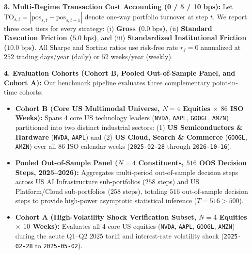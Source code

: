 \documentclass[10pt,a4paper,twocolumn]{article}
\begin{document}
\noindent\textbf{3. Multi-Regime Transaction Cost Accounting (0 / 5 / 10 bps):} Let $\text{TO}_{s,t} = |\text{pos}_{s,t} - \text{pos}_{s,t-1}|$ denote one-way portfolio turnover at step $t$. We report three cost tiers for every strategy: (i) \textbf{Gross ($0.0\text{ bps}$)}, (ii) \textbf{Standard Execution Friction ($5.0\text{ bps}$)}, and (iii) \textbf{Standardized Institutional Friction ($10.0\text{ bps}$)}. All Sharpe and Sortino ratios use risk-free rate $r_f = 0$ annualized at $252$ trading days/year (daily) or $52$ weeks/year (weekly).

\noindent\textbf{4. Evaluation Cohorts (Cohort B, Pooled Out-of-Sample Panel, and Cohort A):} Our benchmark pipeline evaluates three complementary point-in-time cohorts:
\begin{itemize}
  \setlength{\itemsep}{0.5pt}\setlength{\parskip}{0pt}
  \item \textbf{Cohort B (Core US Multimodal Universe, $N=4$ Equities $\times$ $86$ ISO Weeks):} Spans 4 core US technology leaders (\texttt{NVDA}, \texttt{AAPL}, \texttt{GOOGL}, \texttt{AMZN}) partitioned into two distinct industrial sectors: (1) \textbf{US Semiconductors \& Hardware} (\texttt{NVDA}, \texttt{AAPL}) and (2) \textbf{US Cloud, Search \& Commerce} (\texttt{GOOGL}, \texttt{AMZN}) over all 86 ISO calendar weeks (\texttt{2025-02-28} through \texttt{2026-10-16}).
  \item \textbf{Pooled Out-of-Sample Panel ($N=4$ Constituents, $516$ OOS Decision Steps, 2025--2026):} Aggregates multi-period out-of-sample decision steps across US AI Infrastructure sub-portfolios ($258$ steps) and US Platform/Cloud sub-portfolios ($258$ steps), totaling $516$ out-of-sample decision steps to provide high-power asymptotic statistical inference ($T = 516 > 500$).
  \item \textbf{Cohort A (High-Volatility Shock Verification Subset, $N=4$ Equities $\times$ $10$ Weeks):} Evaluates all 4 core US equities (\texttt{NVDA}, \texttt{AAPL}, \texttt{GOOGL}, \texttt{AMZN}) during the acute Q1--Q2 2025 tariff and interest-rate volatility shock (\texttt{2025-02-28} to \texttt{2025-05-02}).
\end{itemize}
\end{document}

